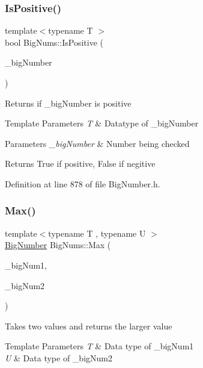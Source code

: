 \subsubsection{\texorpdfstring{IsPositive()}{IsPositive()}}
{\footnotesize\ttfamily template$<$typename T $>$ \\
bool Big\+Nums\+::\+Is\+Positive (\begin{DoxyParamCaption}\item[{const T \&}]{\+\_\+big\+Number }\end{DoxyParamCaption})}

Returns if \+\_\+big\+Number is positive 
\begin{DoxyTemplParams}{Template Parameters}
{\em T} & Datatype of \+\_\+big\+Number \\
\hline
\end{DoxyTemplParams}

\begin{DoxyParams}{Parameters}
{\em \+\_\+big\+Number} & Number being checked \\
\hline
\end{DoxyParams}
\begin{DoxyReturn}{Returns}
True if positive, False if negitive 
\end{DoxyReturn}


Definition at line 878 of file Big\+Number.\+h.

\mbox{\label{namespace_big_nums_a6ae2ed93d9956ac117c4fc399b72aee7}} 
\subsubsection{\texorpdfstring{Max()}{Max()}}
{\footnotesize\ttfamily template$<$typename T , typename U $>$ \\
\mbox{\hyperlink{class_big_nums_1_1_big_number}{Big\+Number}} Big\+Nums\+::\+Max (\begin{DoxyParamCaption}\item[{const T \&}]{\+\_\+big\+Num1,  }\item[{const U \&}]{\+\_\+big\+Num2 }\end{DoxyParamCaption})}

Takes two values and returns the larger value 
\begin{DoxyTemplParams}{Template Parameters}
{\em T} & Data type of \+\_\+big\+Num1 \\
\hline
{\em U} & Data type of \+\_\+big\+Num2 \\
\hline
\end{DoxyTemplParams}


